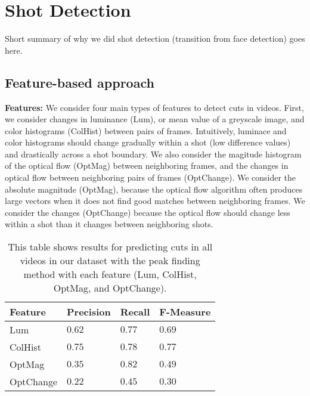 \section*{Shot Detection}

Short summary of why we did shot detection (transition from face detection) goes here.

\subsection*{Feature-based approach}

\textbf{Features:} We consider four main types of features to detect cuts in videos. First, we consider changes in luminance (Lum), or mean value of a greyscale image, and color histograms (ColHist) between pairs of frames. Intuitively, luminace and color histograms should change gradually within a shot (low difference values) and drastically across a shot boundary. We also consider the magitude histogram of the optical flow (OptMag) between neighboring frames, and the changes in optical flow between neighboring pairs of frames (OptChange). We consider the absolute magnitude (OptMag), because the optical flow algorithm often produces large vectors when it does not find good matches between neighboring frames. We consider the changes (OptChange) because the optical flow should change less within a shot than it changes between neighboring shots.
\\

\begin{table}[h!]
  \begin{center}
  	\small{
	\begin{tabular}{l|lll}
	Feature   & Precision  & Recall     & F-Measure  \\ \hline
	Lum       & $0.62$ & $0.77$ & $0.69 $ \\
	ColHist   & $0.75$ & $0.78$ & $0.77$ \\
	OptMag    & $0.35$ & $0.82$ & $0.49$ \\
	OptChange & $0.22$ & $0.45$ & $0.30$ \\ \hline
	\end{tabular}
	}
  \end{center}
  \label{table:peakresults}
  \caption{This table shows results for predicting cuts in all videos in our dataset with the peak finding method with each feature (Lum, ColHist, OptMag, and OptChange).}
\end{table} 

